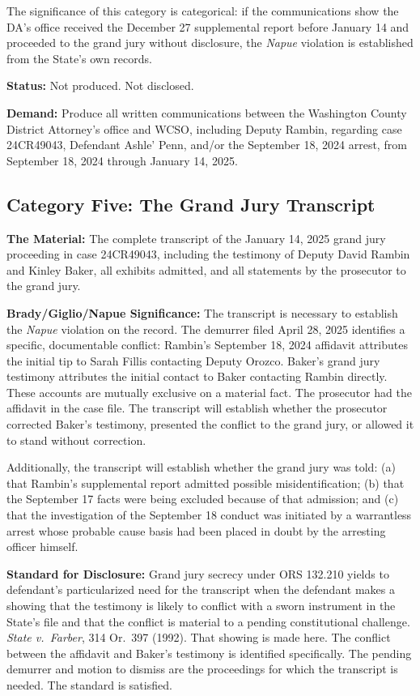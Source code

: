 \documentclass[12pt,letterpaper]{extarticle}
\begin{document}
The significance of this category is categorical: if the communications show the
DA's office received the December 27 supplemental report before January 14 and
proceeded to the grand jury without disclosure, the \textit{Napue} violation is
established from the State's own records.

\textbf{Status:} Not produced. Not disclosed.

\textbf{Demand:} Produce all written communications between the Washington County
District Attorney's office and WCSO, including Deputy Rambin, regarding case
24CR49043, Defendant Ashle' Penn, and/or the September 18, 2024 arrest, from
September 18, 2024 through January 14, 2025.

\subsection{Category Five: The Grand Jury Transcript}

\textbf{The Material:} The complete transcript of the January 14, 2025 grand jury
proceeding in case 24CR49043, including the testimony of Deputy David Rambin and
Kinley Baker, all exhibits admitted, and all statements by the prosecutor to the
grand jury.

\textbf{Brady/Giglio/Napue Significance:} The transcript is necessary to establish
the \textit{Napue} violation on the record. The demurrer filed April 28, 2025
identifies a specific, documentable conflict: Rambin's September 18, 2024
affidavit attributes the initial tip to Sarah Fillis contacting Deputy Orozco.
Baker's grand jury testimony attributes the initial contact to Baker contacting
Rambin directly. These accounts are mutually exclusive on a material fact. The
prosecutor had the affidavit in the case file. The transcript will establish
whether the prosecutor corrected Baker's testimony, presented the conflict to the
grand jury, or allowed it to stand without correction.

Additionally, the transcript will establish whether the grand jury was told: (a)
that Rambin's supplemental report admitted possible misidentification; (b) that the
September 17 facts were being excluded because of that admission; and (c) that the
investigation of the September 18 conduct was initiated by a warrantless arrest
whose probable cause basis had been placed in doubt by the arresting officer
himself.

\textbf{Standard for Disclosure:} Grand jury secrecy under ORS 132.210 yields to
defendant's particularized need for the transcript when the defendant makes a
showing that the testimony is likely to conflict with a sworn instrument in the
State's file and that the conflict is material to a pending constitutional
challenge. \textit{State v.\ Farber}, 314 Or.\ 397 (1992). That showing is made
here. The conflict between the affidavit and Baker's testimony is identified
specifically. The pending demurrer and motion to dismiss are the proceedings for
which the transcript is needed. The standard is satisfied.
\end{document}
